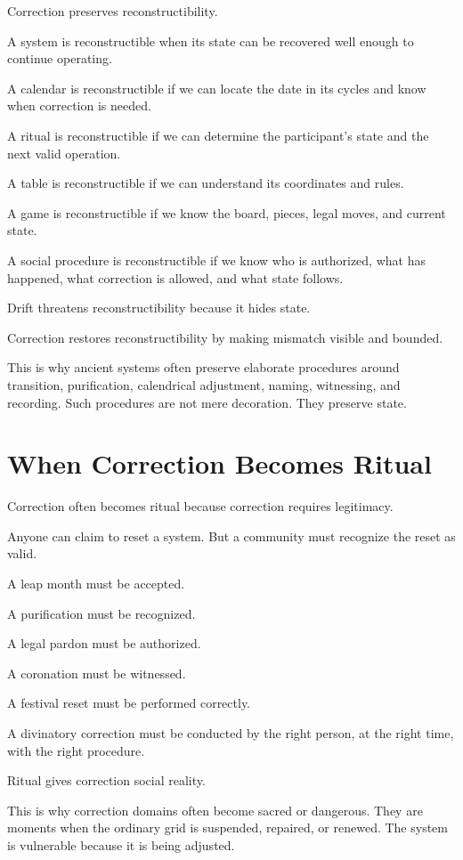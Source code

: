 \documentclass[11pt]{book}
\begin{document}
Correction preserves reconstructibility.

A system is reconstructible when its state can be recovered well enough to continue operating.

A calendar is reconstructible if we can locate the date in its cycles and know when correction is needed.

A ritual is reconstructible if we can determine the participant's state and the next valid operation.

A table is reconstructible if we can understand its coordinates and rules.

A game is reconstructible if we know the board, pieces, legal moves, and current state.

A social procedure is reconstructible if we know who is authorized, what has happened, what correction is allowed, and what state follows.

Drift threatens reconstructibility because it hides state.

Correction restores reconstructibility by making mismatch visible and bounded.

This is why ancient systems often preserve elaborate procedures around transition, purification, calendrical adjustment, naming, witnessing, and recording. Such procedures are not mere decoration. They preserve state.

\section{When Correction Becomes Ritual}

Correction often becomes ritual because correction requires legitimacy.

Anyone can claim to reset a system. But a community must recognize the reset as valid.

A leap month must be accepted.

A purification must be recognized.

A legal pardon must be authorized.

A coronation must be witnessed.

A festival reset must be performed correctly.

A divinatory correction must be conducted by the right person, at the right time, with the right procedure.

Ritual gives correction social reality.

This is why correction domains often become sacred or dangerous. They are moments when the ordinary grid is suspended, repaired, or renewed. The system is vulnerable because it is being adjusted.
\end{document}
